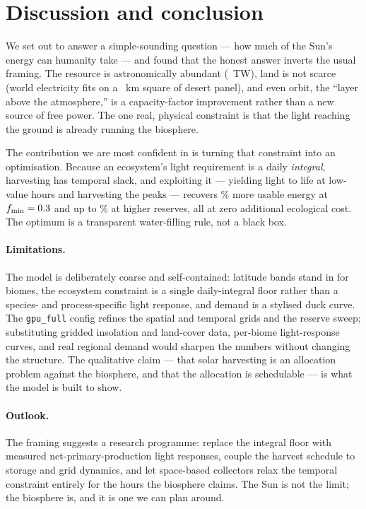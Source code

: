 \section{Discussion and conclusion}

We set out to answer a simple-sounding question --- how much of the Sun's
energy can humanity take --- and found that the honest answer inverts the usual
framing. The resource is astronomically abundant (\InterceptedTW~TW), land is
not scarce (world electricity fits on a \AreaWorldSide~km square of desert
panel), and even orbit, the ``layer above the atmosphere,'' is a
capacity-factor improvement rather than a new source of free power. The one
real, physical constraint is that the light reaching the ground is already
running the biosphere.

The contribution we are most confident in is turning that constraint into an
optimisation. Because an ecosystem's light requirement is a daily
\emph{integral}, harvesting has temporal slack, and exploiting it --- yielding
light to life at low-value hours and harvesting the peaks --- recovers
\TemporalGainHead\% more usable energy at $f_{\min}=0.3$ and up to
\TemporalGainMax\% at higher reserves, all at zero additional ecological cost.
The optimum is a transparent water-filling rule, not a black box.

\paragraph{Limitations.} The model is deliberately coarse and self-contained:
latitude bands stand in for biomes, the ecosystem constraint is a single
daily-integral floor rather than a species- and process-specific light
response, and demand is a stylised duck curve. The \texttt{gpu\_full} config
refines the spatial and temporal grids and the reserve sweep; substituting
gridded insolation and land-cover data, per-biome light-response curves, and
real regional demand would sharpen the numbers without changing the structure.
The qualitative claim --- that solar harvesting is an allocation problem
against the biosphere, and that the allocation is schedulable --- is what the
model is built to show.

\paragraph{Outlook.} The framing suggests a research programme: replace the
integral floor with measured net-primary-production light responses, couple the
harvest schedule to storage and grid dynamics, and let space-based collectors
relax the temporal constraint entirely for the hours the biosphere claims. The
Sun is not the limit; the biosphere is, and it is one we can plan around.
